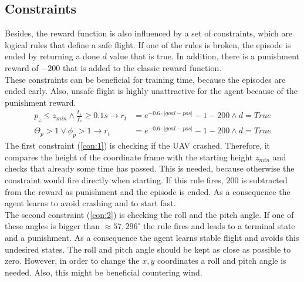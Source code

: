 \subsection{Constraints}\label{sec:constraint}
Besides, the reward function is also influenced by a set of constraints, which are logical rules that define a safe flight. 
If one of the rules is broken, the episode is ended by returning a done $d$ value that is true. 
In addition, there is a punishment reward of $-200$ that is added to the classic reward function.\\
These constraints can be beneficial for training time, because the episodes are ended early. 
Also, unsafe flight is highly unattractive for the agent because of the punishment reward. 
\begin{align}
	p_{z} \leq z_{min} \land \frac{t_s}{f_s} \geq 0.1 s \to r_t &= e^{-0.6 \cdot |goal - pos|} - 1 -200 \land d = True \label{con:1}\\
	\Theta_p > 1 \lor \phi_p > 1 \to r_t &= e^{-0.6 \cdot |goal - pos|} - 1 -200 \land d = True \label{con:2}
\end{align}
The first constraint (\cref{con:1}) is checking if the UAV crashed. 
Therefore, it compares the height of the coordinate frame with the starting height $z_{min}$ and checks that already some time has passed. 
This is needed, because otherwise the constraint would fire directly when starting. 
If this rule fires, $200$ is subtracted from the reward as punishment and the episode is ended. 
As a consequence the agent learns to avoid crashing and to start fast.\\
The second constraint (\cref{con:2}) is checking the roll and the pitch angle. 
If one of these angles is bigger than $\approx 57,296^{\circ}$ the rule fires and leads to a terminal state and a punishment. 
As a consequence the agent learns stable flight and avoids this undesired states. The roll and pitch angle should be kept as close as possible to zero. 
However, in order to change the $x,y$ coordinates a roll and pitch angle is needed. Also, this might be beneficial countering wind.

\newpage


